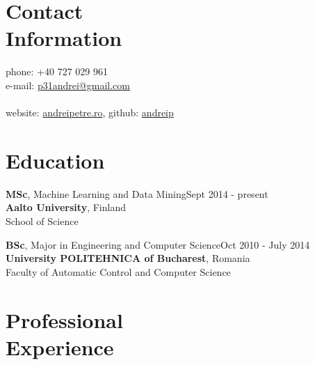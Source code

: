 \documentclass[margin,line]{resume}
\begin{document}
\begin{resume}

    \section{\mysidestyle Contact\\Information}

    phone: +40 727 029 961              \\
    e-mail:  \href{mailto:p31andrei@gmail.com}{p31andrei@gmail.com}  \vspace{0mm}\\\vspace{-4.5mm}\\%
    website: \href{http://andreipetre.ro}{andreipetre.ro}, github: \href{https://github.com/andreip/}{andreip}

    \section{\mysidestyle Education}

    \textbf{MSc}, Machine Learning and Data Mining\hfill Sept 2014 - present\\
    \textbf{Aalto University}, Finland\\
    School of Science

    \textbf{BSc}, Major in Engineering and Computer Science\hfill Oct 2010 - July 2014\\
    \textbf{University POLITEHNICA of Bucharest}, Romania\\
    Faculty of Automatic Control and Computer Science

    \section{\mysidestyle Professional\\Experience}


\end{resume}
\end{document}
